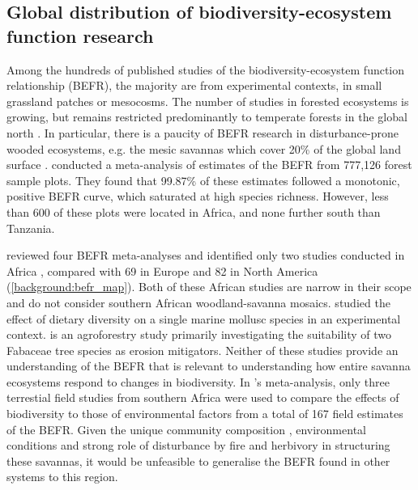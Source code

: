 \begin{refsection}
\subsection{Global distribution of biodiversity-ecosystem function research}
\label{background:ssec:befr_global}

Among the hundreds of published studies of the biodiversity-ecosystem function relationship (BEFR), the majority are from experimental contexts, in small grassland patches or mesocosms. The number of studies in forested ecosystems is growing, but remains restricted predominantly to temperate forests in the global north \citep{Clarke2017}. In particular, there is a paucity of BEFR research in disturbance-prone wooded ecosystems, e.g. the mesic savannas which cover \textapprox{}20\% of the global land surface \citep{Scholes1993}. \citet{Liang2016} conducted a meta-analysis of estimates of the BEFR from 777,126 forest sample plots. They found that 99.87\% of these estimates followed a monotonic, positive BEFR curve, which saturated at high species richness. However, less than 600 of these plots were located in Africa, and none further south than Tanzania. 

\citet{Clarke2017} reviewed four BEFR meta-analyses \citep{Gamfeldt2015, Griffin2013a, Zhang2012, Cardinale2009} and identified only two studies conducted in Africa \citep{Foster1999, Burleigh1997}, compared with 69 in Europe and 82 in North America (\autoref{background:befr_map}). Both of these African studies are narrow in their scope and do not consider southern African woodland-savanna mosaics. \citet{Foster1999} studied the effect of dietary diversity on a single marine mollusc species in an experimental context. \citet{Burleigh1997} is an agroforestry study primarily investigating the suitability of two Fabaceae tree species as erosion mitigators. Neither of these studies provide an understanding of the BEFR that is relevant to understanding how entire savanna ecosystems respond to changes in biodiversity. In \citeauthor{Duffy2017}'s \citeyearpar{Duffy2017} meta-analysis, only three terrestial field studies from southern Africa were used to compare the effects of biodiversity to those of environmental factors from a total of 167 field estimates of the BEFR. Given the unique community composition \citep{Lehmann2011}, environmental conditions \citep{Linder2003} and strong role of disturbance by fire and herbivory in structuring these savannas, it would be unfeasible to generalise the BEFR found in other systems to this region.


\end{refsection}
